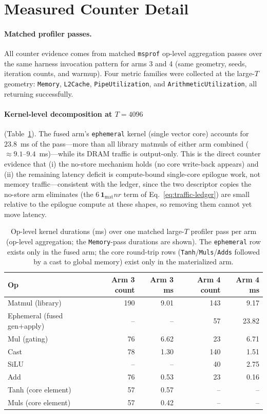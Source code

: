 \section{Measured Counter Detail}
\label{app:counters}

\paragraph{Matched profiler passes.}
All counter evidence comes from matched \texttt{msprof} op-level aggregation
passes over the same harness invocation pattern for arms 3 and 4 (same
geometry, seeds, iteration counts, and warmup). Four metric families were
collected at the large-$T$ geometry: \texttt{Memory},
\texttt{L2Cache}, \texttt{PipeUtilization}, and
\texttt{ArithmeticUtilization}, all returning successfully.

\paragraph{Kernel-level decomposition at $T{=}4096$}
(Table~\ref{tab:opdecomp}). The fused arm's \texttt{ephemeral} kernel
(single vector core) accounts for $23.8$~ms of the pass---more than all
library matmuls of either arm combined ($\approx 9.1$--$9.4$~ms)---while its
DRAM traffic is output-only. This is the direct counter evidence that (i) the
no-store mechanism holds (no core write-back appears) and (ii) the remaining
latency deficit is compute-bound single-core epilogue work, not memory
traffic---consistent with the ledger, since the two descriptor copies the
no-store arm eliminates (the $6\,\mathbf 1_{\mathrm{mat}}nr$ term of
Eq.~\eqref{eq:traffic-ledger}) are small relative to the epilogue compute
at these shapes, so removing them cannot yet move latency.

\begin{table}[h]
\centering
\footnotesize
\caption{Op-level kernel durations (ms) over one matched large-$T$
profiler pass per arm (op-level aggregation; the \texttt{Memory}-pass
durations are shown). The \texttt{ephemeral} row exists only in the fused
arm; the core round-trip rows (\texttt{Tanh}/\texttt{Muls}/\texttt{Adds}
followed by a cast to global memory) exist only in the materialized arm.}
\label{tab:opdecomp}
\begin{tabular}{lrrrr}
\toprule
Op & Arm 3 count & Arm 3 ms & Arm 4 count & Arm 4 ms \\
\midrule
Matmul (library)      & 190 & 9.01 & 143 & 9.17 \\
Ephemeral (fused gen+apply) & -- & -- & 57 & 23.82 \\
Mul (gating)          & 76  & 6.62 & 23  & 6.71 \\
Cast                  & 78  & 1.30 & 140 & 1.51 \\
SiLU                  & --  & --   & 40  & 2.75 \\
Add                   & 76  & 0.53 & 23  & 0.16 \\
Tanh (core element)   & 57  & 0.57 & --  & -- \\
Muls (core element)   & 57  & 0.42 & --  & -- \\
\bottomrule
\end{tabular}
\end{table}

